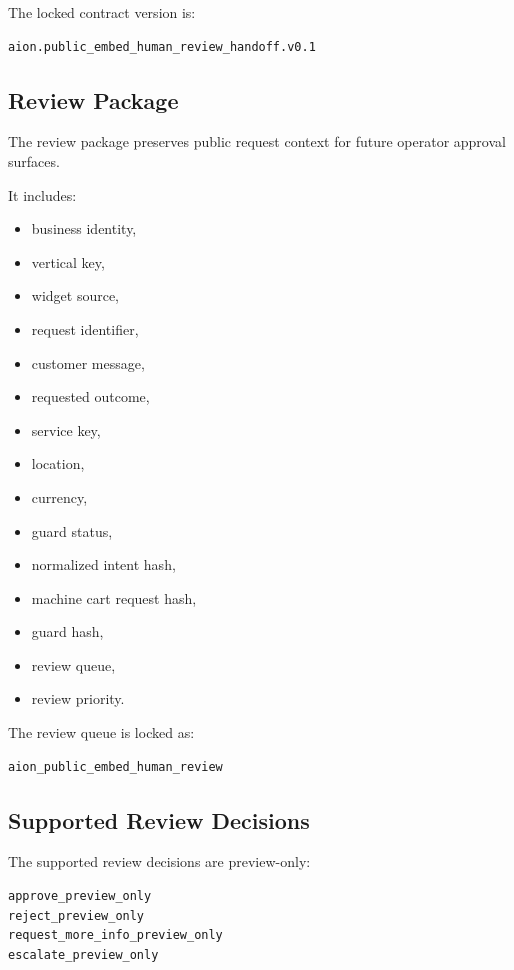 The locked contract version is:

\begin{verbatim}
aion.public_embed_human_review_handoff.v0.1
\end{verbatim}

\subsection{Review Package}

The review package preserves public request context for future operator approval surfaces.

It includes:

\begin{itemize}
  \item business identity,
  \item vertical key,
  \item widget source,
  \item request identifier,
  \item customer message,
  \item requested outcome,
  \item service key,
  \item location,
  \item currency,
  \item guard status,
  \item normalized intent hash,
  \item machine cart request hash,
  \item guard hash,
  \item review queue,
  \item review priority.
\end{itemize}

The review queue is locked as:

\begin{verbatim}
aion_public_embed_human_review
\end{verbatim}

\subsection{Supported Review Decisions}

The supported review decisions are preview-only:

\begin{verbatim}
approve_preview_only
reject_preview_only
request_more_info_preview_only
escalate_preview_only
\end{verbatim}


